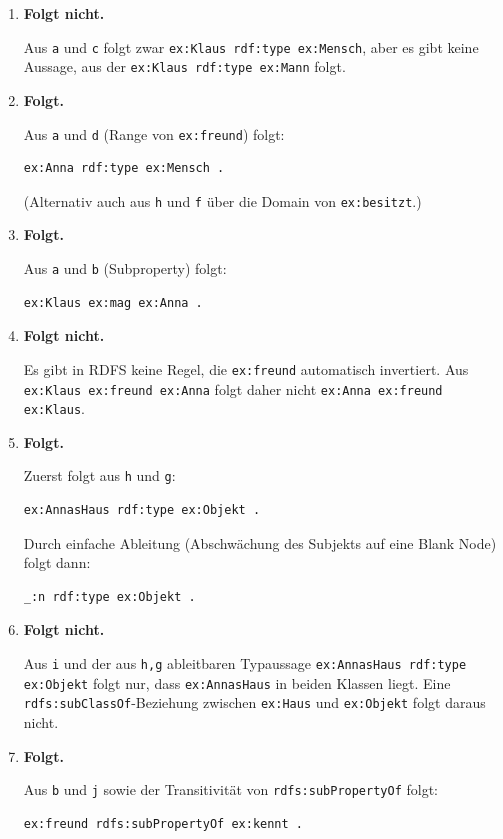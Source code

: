 \documentclass[a4paper]{article}
\begin{document}
\begin{enumerate}
    \item \textbf{Folgt nicht.}

    Aus \texttt{a} und \texttt{c} folgt zwar \texttt{ex:Klaus rdf:type ex:Mensch}, aber es gibt keine Aussage, aus der \texttt{ex:Klaus rdf:type ex:Mann} folgt.

    \item \textbf{Folgt.}

    Aus \texttt{a} und \texttt{d} (Range von \texttt{ex:freund}) folgt:

    \begin{lstlisting}
ex:Anna rdf:type ex:Mensch .
    \end{lstlisting}

    (Alternativ auch aus \texttt{h} und \texttt{f} über die Domain von \texttt{ex:besitzt}.)

    \item \textbf{Folgt.}

    Aus \texttt{a} und \texttt{b} (Subproperty) folgt:

    \begin{lstlisting}
ex:Klaus ex:mag ex:Anna .
    \end{lstlisting}

    \item \textbf{Folgt nicht.}

    Es gibt in RDFS keine Regel, die \texttt{ex:freund} automatisch invertiert. Aus \texttt{ex:Klaus ex:freund ex:Anna} folgt daher nicht \texttt{ex:Anna ex:freund ex:Klaus}.

    \item \textbf{Folgt.}

    Zuerst folgt aus \texttt{h} und \texttt{g}:

    \begin{lstlisting}
ex:AnnasHaus rdf:type ex:Objekt .
    \end{lstlisting}

    Durch einfache Ableitung (Abschwächung des Subjekts auf eine Blank Node) folgt dann:

    \begin{lstlisting}
_:n rdf:type ex:Objekt .
    \end{lstlisting}

    \item \textbf{Folgt nicht.}

    Aus \texttt{i} und der aus \texttt{h,g} ableitbaren Typaussage \texttt{ex:AnnasHaus rdf:type ex:Objekt} folgt nur, dass \texttt{ex:AnnasHaus} in beiden Klassen liegt. Eine \texttt{rdfs:subClassOf}-Beziehung zwischen \texttt{ex:Haus} und \texttt{ex:Objekt} folgt daraus nicht.

    \item \textbf{Folgt.}

    Aus \texttt{b} und \texttt{j} sowie der Transitivität von \texttt{rdfs:subPropertyOf} folgt:

    \begin{lstlisting}
ex:freund rdfs:subPropertyOf ex:kennt .
    \end{lstlisting}
\end{enumerate}

\end{document}
